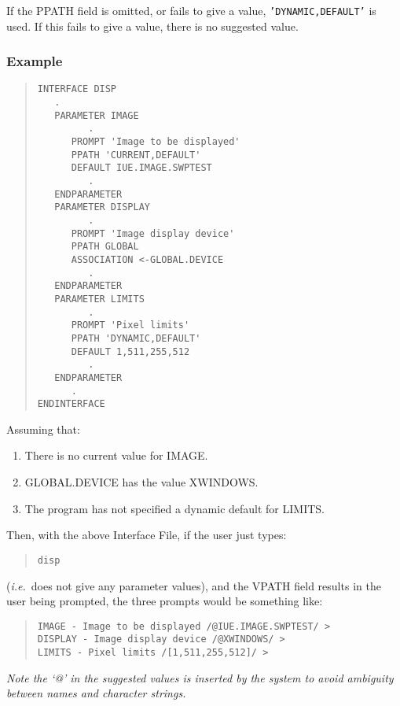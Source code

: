 \documentclass[twoside,11pt]{article}
\renewcommand{\_}{\texttt{\symbol{95}}}
\begin{document}
If the PPATH field is omitted, or fails to give a value,
\texttt{'DYNAMIC,DEFAULT'} is used.
If this fails to give a value, there is no suggested value.
\subsubsection*{Example}
\begin{quote} \begin{verbatim}
INTERFACE DISP
   .
   PARAMETER IMAGE
         .
      PROMPT 'Image to be displayed'
      PPATH 'CURRENT,DEFAULT'
      DEFAULT IUE.IMAGE.SWPTEST
         .
   ENDPARAMETER
   PARAMETER DISPLAY
         .
      PROMPT 'Image display device'
      PPATH GLOBAL
      ASSOCIATION <-GLOBAL.DEVICE
         .
   ENDPARAMETER
   PARAMETER LIMITS
         .
      PROMPT 'Pixel limits'
      PPATH 'DYNAMIC,DEFAULT'
      DEFAULT 1,511,255,512
         .
   ENDPARAMETER
      .
ENDINTERFACE
\end{verbatim} \end{quote}
Assuming that:
\begin{enumerate}
\item There is no current value for IMAGE.
\item GLOBAL.DEVICE has the value XWINDOWS.
\item The program has not specified a dynamic default for LIMITS.
\end{enumerate}
Then, with the above Interface File, if the user just types:
\begin{quote} \begin{verbatim}
disp
\end{verbatim} \end{quote}
({\em i.e.}\ does not give any parameter values), and the VPATH field
results in the user being prompted, the three prompts would be something like:
\begin{quote} \begin{verbatim}
IMAGE - Image to be displayed /@IUE.IMAGE.SWPTEST/ >
DISPLAY - Image display device /@XWINDOWS/ >
LIMITS - Pixel limits /[1,511,255,512]/ >
\end{verbatim} \end{quote}
{\em Note the `@' in the suggested values is inserted by the system to avoid
ambiguity between names and character strings.}
\end{document}
